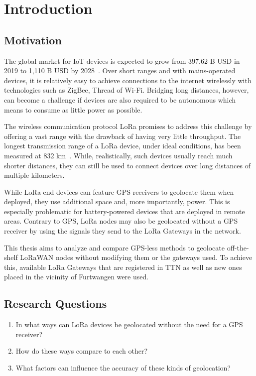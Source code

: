 \chapter{Introduction}

\section{Motivation}

The global market for \ac{IoT} devices is expected to grow from 397.62 B USD in 2019 to 1,110 B USD by 2028~\cite{grand_view_research_global_2022}.
Over short ranges and with mains-operated devices, it is relatively easy to achieve connections to the internet wirelessly with technologies such as ZigBee, Thread of Wi-Fi.
Bridging long distances, however, can become a challenge if devices are also required to be autonomous which means to consume as little power as possible.

The wireless communication protocol \ac{LoRa} promises to address this challenge by offering a vast range with the drawback of having very little throughput.
The longest transmission range of a \ac{LoRa} device, under ideal conditions, has been measured at 832 km~\cite{the_things_network_global_team_lora_nodate}.
While, realistically, such devices usually reach much shorter distances, they can still be used to connect devices over long distances of multiple kilometers.

While \ac{LoRa} end devices can feature \ac{GPS} receivers to geolocate them when deployed, they use additional space and, more importantly, power.
This is especially problematic for battery-powered devices that are deployed in remote areas.
Contrary to \ac{GPS}, \ac{LoRa} nodes may also be geolocated without a \ac{GPS} receiver by using the signals they send to the \ac{LoRa} Gateways in the network.

This thesis aims to analyze and compare \ac{GPS}-less methods to geolocate off-the-shelf \ac{LoRaWAN} nodes without modifying them or the gateways used.
To achieve this, available \ac{LoRa} Gateways that are registered in \acf{TTN} as well as new ones placed in the vicinity of Furtwangen were used.

\section{Research Questions}

\begin{enumerate}
      \item In what ways can \ac{LoRa} devices be geolocated without the need for a \ac{GPS} receiver?
      \item How do these ways compare to each other?
      \item What factors can influence the accuracy of these kinds of geolocation?
\end{enumerate}

